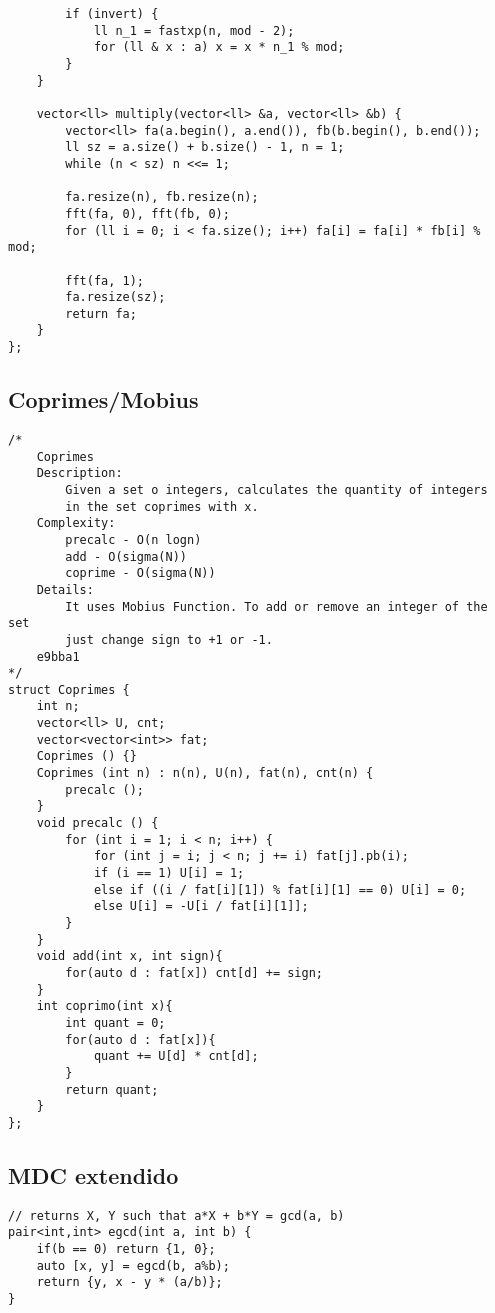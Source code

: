 \documentclass{article}
\begin{document}
\begin{verbatim}
        if (invert) {
            ll n_1 = fastxp(n, mod - 2);
            for (ll & x : a) x = x * n_1 % mod;
        }
    }
 
    vector<ll> multiply(vector<ll> &a, vector<ll> &b) {
        vector<ll> fa(a.begin(), a.end()), fb(b.begin(), b.end());
        ll sz = a.size() + b.size() - 1, n = 1;
        while (n < sz) n <<= 1;

        fa.resize(n), fb.resize(n);
        fft(fa, 0), fft(fb, 0);
        for (ll i = 0; i < fa.size(); i++) fa[i] = fa[i] * fb[i] % mod;

        fft(fa, 1);
        fa.resize(sz);
        return fa;
    }
};\end{verbatim}
\subsection{Coprimes/Mobius}
\begin{verbatim}
/*
    Coprimes
    Description: 
        Given a set o integers, calculates the quantity of integers
        in the set coprimes with x.
    Complexity: 
        precalc - O(n logn)
        add - O(sigma(N))
        coprime - O(sigma(N))
    Details:
        It uses Mobius Function. To add or remove an integer of the set
        just change sign to +1 or -1.
    e9bba1
*/
struct Coprimes {
    int n;
    vector<ll> U, cnt;
    vector<vector<int>> fat;
    Coprimes () {}
    Coprimes (int n) : n(n), U(n), fat(n), cnt(n) {
        precalc ();
    }
    void precalc () {
        for (int i = 1; i < n; i++) {
            for (int j = i; j < n; j += i) fat[j].pb(i); 
            if (i == 1) U[i] = 1;
            else if ((i / fat[i][1]) % fat[i][1] == 0) U[i] = 0;
            else U[i] = -U[i / fat[i][1]];
        }
    }
    void add(int x, int sign){
        for(auto d : fat[x]) cnt[d] += sign;
    }
    int coprimo(int x){
        int quant = 0;
        for(auto d : fat[x]){
            quant += U[d] * cnt[d];
        }
        return quant;
    }
};\end{verbatim}
\subsection{MDC extendido}
\begin{verbatim}
// returns X, Y such that a*X + b*Y = gcd(a, b)
pair<int,int> egcd(int a, int b) {
	if(b == 0) return {1, 0};
	auto [x, y] = egcd(b, a%b);
	return {y, x - y * (a/b)};
}
\end{verbatim}
\end{document}
